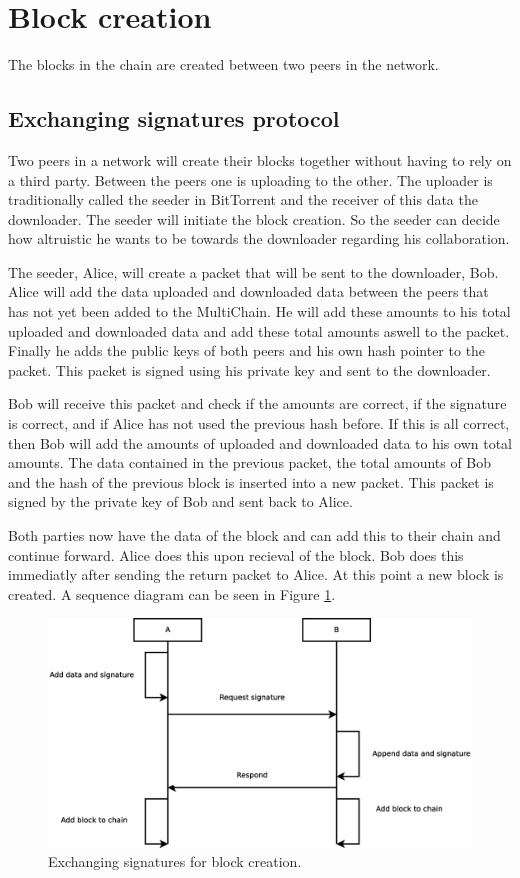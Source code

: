 \section{Block creation}
\label{design:block_creation}
The blocks in the chain are created between two peers in the network.


\subsection{Exchanging signatures protocol}
Two peers in a network will create their blocks together without having to rely on a third party.
Between the peers one is uploading to the other.
The uploader is traditionally called the seeder in BitTorrent and the receiver of this data the downloader\cite{Cohen-bittorrent}.
The seeder will initiate the block creation.
So the seeder can decide how altruistic he wants to be towards the downloader regarding his collaboration.

The seeder, Alice, will create a packet that will be sent to the downloader, Bob.
Alice will add the data uploaded and downloaded data between the peers
that has not yet been added to the MultiChain.
He will add these amounts to his total uploaded and downloaded data and add these total amounts aswell to the packet.
Finally he adds the public keys of both peers and his own hash pointer to the packet.
This packet is signed using his private key and sent to the downloader.

Bob will receive this packet and check if the amounts are correct, if the signature is correct,
and if Alice has not used the previous hash before.
If this is all correct,
then Bob will add the amounts of uploaded and downloaded data to his own total amounts.
The data contained in the previous packet, the total amounts of Bob and the hash of the previous block is
inserted into a new packet.
This packet is signed by the private key of Bob and sent back to Alice.

Both parties now have the data of the block and can add this to their chain and continue forward.
Alice does this upon recieval of the block.
Bob does this immediatly after sending the return packet to Alice.
At this point a new block is created.
A sequence diagram can be seen in Figure \ref{fig:exchange-new-sequence}.

\begin{figure}[tbp]
	\centerline{\includegraphics[scale=0.3]{design/figs/exchange_new.eps}}
	\caption{Exchanging signatures for block creation.}
	\label{fig:exchange-new-sequence}
\end{figure}


